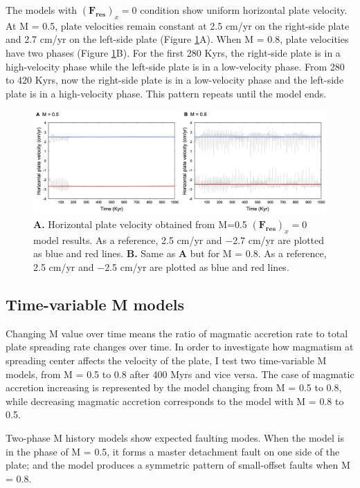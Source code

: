 \documentclass[letterpaper,12pt,notitle]{memphisthesis}                     %
\begin{document}
The models with $(\boldsymbol{F_{res}})_x=0$ condition show uniform horizontal plate velocity. At M = 0.5, plate velocities remain constant at 2.5 cm/yr on the right-side plate and 2.7 cm/yr on the left-side plate (Figure \ref{fig:f0vel}A). When M = 0.8, plate velocities have two phases (Figure \ref{fig:f0vel}B). For the first 280 Kyrs, the right-side plate is in a high-velocity phase while the left-side plate is in a low-velocity phase. From 280 to 420 Kyrs, now the right-side plate is in a low-velocity phase and the left-side plate is in a high-velocity phase. This pattern repeats until the model ends.

\begin{figure}[!htb]
	\centering
	\includegraphics[width=0.99\linewidth]{./figs/f0vel.png}
	\caption{\textbf{A.} Horizontal plate velocity obtained from M=0.5 $(\boldsymbol{F_{res}})_x=0$ model results. As a reference, 2.5 cm/yr and $-$2.7 cm/yr are plotted as blue and red lines. \textbf{B.} Same as \textbf{A} but for M = 0.8. As a reference, 2.5 cm/yr and $-$2.5 cm/yr are plotted as blue and red lines.}
	\label{fig:f0vel}
\end{figure}

\subsection{Time-variable M models}

Changing M value over time means the ratio of magmatic accretion rate to total plate spreading rate changes over time. In order to investigate how magmatism at spreading center affects the velocity of the plate, I test two time-variable M models, from M = 0.5 to 0.8 after 400 Myrs and vice versa. The case of magmatic accretion increasing is represented by the model changing from M = 0.5 to 0.8, while decreasing magmatic accretion corresponds to the model with M = 0.8 to 0.5.

Two-phase M history models show expected faulting modes. When the model is in the phase of M = 0.5, it forms a master detachment fault on one side of the plate; and the model produces a symmetric pattern of small-offset faults when M = 0.8.
\end{document}
